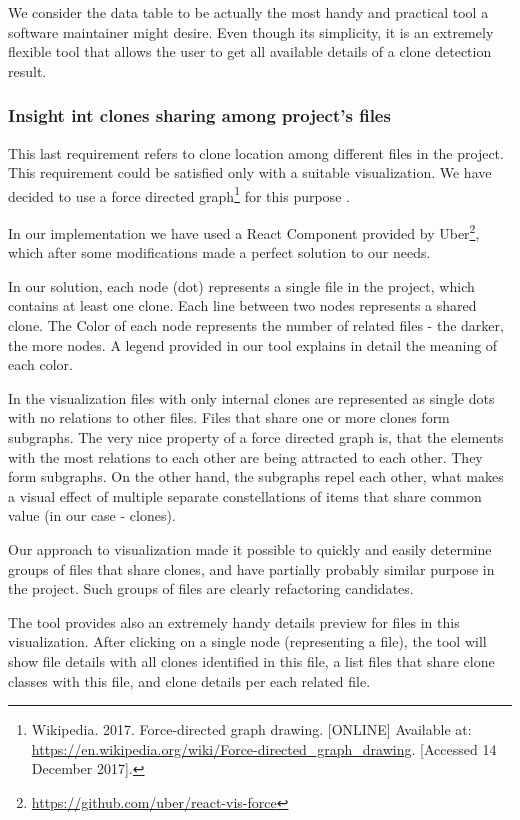 \documentclass{uva-inf-article}
\begin{document}
We consider the data table to be actually the most handy and practical tool a software maintainer might desire. Even though its simplicity, it is an extremely flexible tool that allows the user to get all available details of a clone detection result.

\subsubsection{Insight int clones sharing among project's files}
This last requirement refers to clone location among different files in the project. This requirement could be satisfied only with a suitable visualization. We have decided to use a force directed graph\footnote{Wikipedia. 2017. Force-directed graph drawing. [ONLINE] Available at: \url{https://en.wikipedia.org/wiki/Force-directed\_graph\_drawing}. [Accessed 14 December 2017].} for this purpose .

In our implementation we have used a React Component provided by Uber\footnote{\url{https://github.com/uber/react-vis-force}}, which after some modifications made a perfect solution to our needs. 

In our solution, each node (dot) represents a single file in the project, which contains at least one clone. Each line between two nodes represents a shared clone. The Color of each node represents the number of related files - the darker, the more nodes. A legend provided in our tool explains in detail the meaning of each color. 

In the visualization files with only internal clones are represented as single dots with no relations to other files. Files that share one or more clones form subgraphs. The very nice property of a force directed graph is, that the elements with the most relations to each other are being attracted to each other. They form subgraphs. On the other hand, the subgraphs repel each other, what makes a visual effect of multiple separate constellations of items that share common value (in our case - clones). 

Our approach to visualization made it possible to quickly and easily determine groups of files that share clones, and have partially probably similar purpose in the project. Such groups of files are clearly refactoring candidates. 

The tool provides also an extremely handy details preview for files in this visualization. After clicking on a single node (representing a file), the tool will show file details with all clones identified in this file, a list files that share clone classes with this file, and clone details per each related file. 
\end{document}
